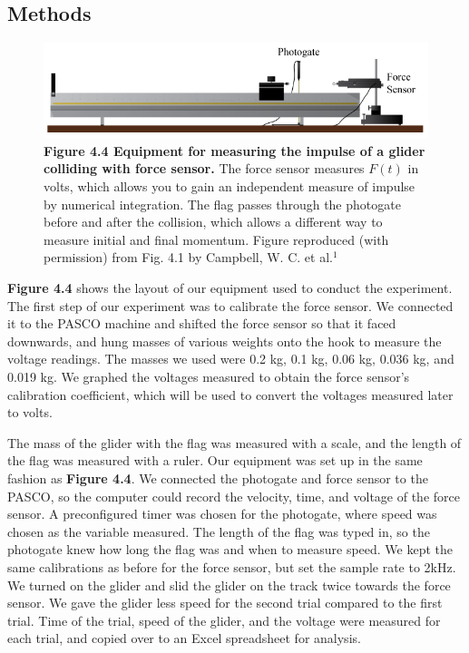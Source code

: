 \documentclass[11pt]{report}
\begin{document}
\subsection*{Methods}
\begin{figure}[h!]
    \includegraphics[width=\linewidth]{Figure44.png}
    \captionsetup{labelformat=empty}
    \caption{\textbf{Figure 4.4 Equipment for measuring the impulse of a glider
        colliding with force sensor.}
    The force sensor measures \(F(t)\) in volts, which allows you to gain an
independent measure of impulse by numerical integration.  The flag passes
through the photogate before and after the collision, which allows a different
way to measure initial and final momentum. Figure reproduced (with permission)
from Fig. 4.1 by Campbell, W. C. et al.$^1$}
\end{figure}

\textbf{Figure 4.4} shows the layout of our equipment used to conduct the
experiment.  The first step of our experiment was to calibrate the force sensor.
We connected it to the PASCO machine and shifted the force sensor so that it faced downwards, and hung masses of
various weights onto the hook to measure the voltage readings.  The masses we
used were 0.2 kg, 0.1 kg, 0.06 kg, 0.036 kg, and 0.019 kg. We graphed the
voltages measured to obtain the force sensor's calibration coefficient, which
will be used to convert the voltages measured later to volts.

\setlength{\parindent}{5ex}
The mass of the glider with the flag was measured with a scale, and the length of the flag was
measured with a ruler.  Our equipment was set up in the same fashion as
\textbf{Figure 4.4}.  We connected the photogate and force sensor to the PASCO,
so the computer could record the velocity, time, and voltage of the force
sensor.  A preconfigured timer was chosen for the photogate, where speed was
chosen as the variable measured.  The length of the flag was typed in, so the
photogate knew how long the flag was and when to measure speed.  We kept the
same calibrations as before for the force sensor, but set the sample rate to
2kHz.  We turned on the glider and slid the glider on the track twice towards
the force sensor.  We gave the glider less speed for the second trial compared
to the first trial.  Time of the trial, speed of the glider, and the voltage
were measured for each trial, and copied over to an Excel spreadsheet for
analysis.  
\end{document}
